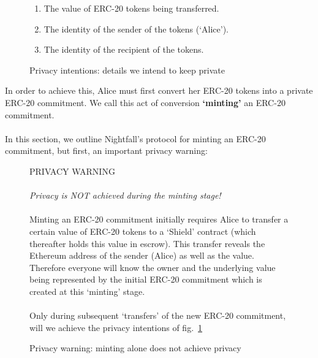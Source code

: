 \documentclass{article}
\begin{document}
\begin{figure}[H]
	\begin{center}
		\begin{framed}
      \begin{enumerate}
        \item The value of ERC-20 tokens being transferred.
        \item The identity of the sender of the tokens (`Alice').
        \item The identity of the recipient of the tokens.
      \end{enumerate}
    \end{framed}
  \end{center}
  \caption{Privacy intentions: details we intend to keep private}
  \label{fig:fPrivacyIntentions}
\end{figure}

\noindent
In order to achieve this, Alice must first convert her ERC-20 tokens into a private ERC-20 commitment. We call this act of conversion \textbf{`minting'} an ERC-20 commitment.\\
\\
In this section, we outline Nightfall's protocol for minting an ERC-20 commitment, but first, an important privacy warning:

\begin{figure}[H]
  \begin{center}
    \begin{mdframed}[backgroundcolor=verylightred]
      \noindent
      PRIVACY WARNING\\
      \\
      \textit{
      Privacy is NOT achieved during the minting stage!
      }\\
      \\
      Minting an ERC-20 commitment initially requires Alice to transfer a certain value of ERC-20 tokens to a `Shield' contract (which thereafter holds this value in escrow). This transfer reveals the Ethereum address of the sender (Alice) as well as the value. Therefore everyone will know the owner and the underlying value being represented by the initial ERC-20 commitment which is created at this `minting' stage.\\
      \\
      Only during subsequent `transfers' of the new ERC-20 commitment, will we achieve the privacy intentions of fig.~\ref{fig:fPrivacyIntentions}
    \end{mdframed}
  \end{center}
  \caption{Privacy warning: minting alone does not achieve privacy}
  \label{fig:fMintWarning}
\end{figure}
\end{document}
